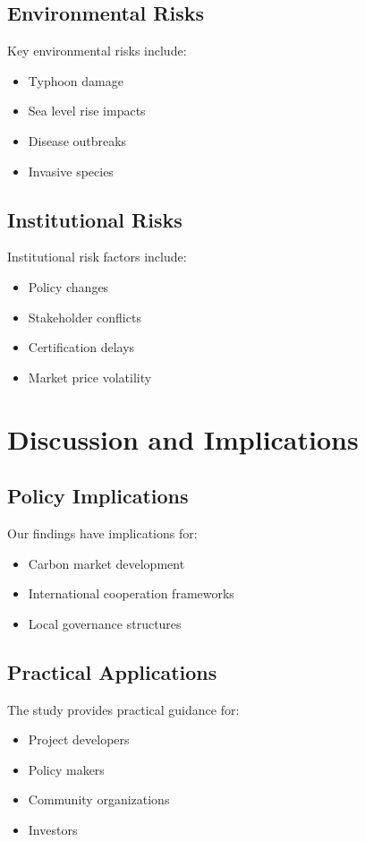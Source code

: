 \documentclass{article}
\theoremstyle{plain}
\theoremstyle{definition}
\theoremstyle{remark}
\begin{document}
\subsection{Environmental Risks}
Key environmental risks include:
\begin{itemize}
\item Typhoon damage
\item Sea level rise impacts
\item Disease outbreaks
\item Invasive species
\end{itemize}

\subsection{Institutional Risks}
Institutional risk factors include:
\begin{itemize}
\item Policy changes
\item Stakeholder conflicts
\item Certification delays
\item Market price volatility
\end{itemize}

\section{Discussion and Implications}

\subsection{Policy Implications}
Our findings have implications for:
\begin{itemize}
\item Carbon market development
\item International cooperation frameworks
\item Local governance structures
\end{itemize}

\subsection{Practical Applications}
The study provides practical guidance for:
\begin{itemize}
\item Project developers
\item Policy makers
\item Community organizations
\item Investors
\end{itemize}
\end{document}
